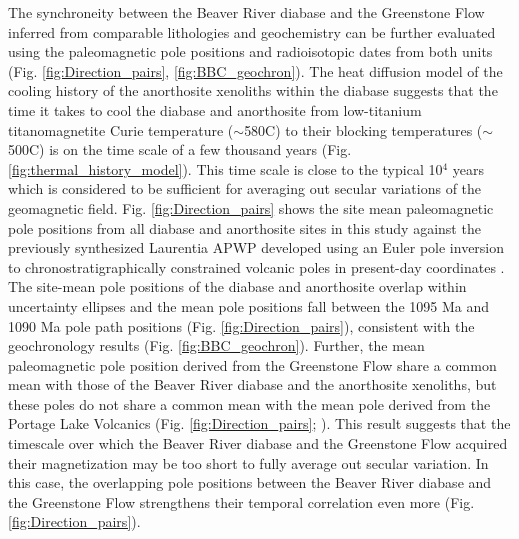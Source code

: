 \documentclass[draft]{agujournal2019}
\begin{document}
The synchroneity between the Beaver River diabase and the Greenstone Flow inferred from comparable lithologies and geochemistry can be further evaluated using the paleomagnetic pole positions and radioisotopic dates from both units (Fig. \ref{fig:Direction_pairs}, \ref{fig:BBC_geochron}). The heat diffusion model of the cooling history of the anorthosite xenoliths within the diabase suggests that the time it takes to cool the diabase and anorthosite from low-titanium titanomagnetite Curie temperature ($\sim$580\textdegree C) to their blocking temperatures ($\sim$500\textdegree C) is on the time scale of a few thousand years (Fig. \ref{fig:thermal_history_model}). This time scale is close to the typical 10$^4$ years which is considered to be sufficient for averaging out secular variations of the geomagnetic field. Fig. \ref{fig:Direction_pairs} shows the site mean paleomagnetic pole positions from all diabase and anorthosite sites in this study against the previously synthesized Laurentia APWP developed using an Euler pole inversion to chronostratigraphically constrained volcanic poles in present-day coordinates \cite{Swanson-Hysell2019a}. The site-mean pole positions of the diabase and anorthosite overlap within uncertainty ellipses and the mean pole positions fall between the 1095 Ma and 1090 Ma pole path positions (Fig. \ref{fig:Direction_pairs}), consistent with the geochronology results (Fig. \ref{fig:BBC_geochron}). Further, the mean paleomagnetic pole position derived from the Greenstone Flow share a common mean with those of the Beaver River diabase and the anorthosite xenoliths, but these poles do not share a common mean with the mean pole derived from the Portage Lake Volcanics (Fig. \ref{fig:Direction_pairs}; ). This result suggests that the timescale over which the Beaver River diabase and the Greenstone Flow acquired their magnetization may be too short to fully average out secular variation. In this case, the overlapping pole positions between the Beaver River diabase and the Greenstone Flow strengthens their temporal correlation even more (Fig. \ref{fig:Direction_pairs}). 
\end{document}
